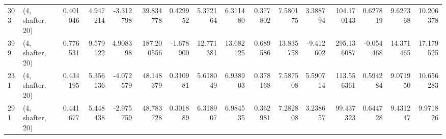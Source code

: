 \begin{tabular}{llrrrrrrrrrrrrrr}
303 &  (4, shafter, 20) &   0.401046 &   4.947214 &  -3.312798 &    39.834778 &   0.429952 &   5.372164 &   6.311480 &  0.377802 &   7.580175 &   3.388794 &   104.170143 &  0.627819 &   9.627368 &  10.206378 \\
399 &  (4, shafter, 20) &   0.776531 &   9.579122 &   4.908398 &   187.200556 &  -1.678900 &  12.771381 &  13.682125 &  0.689586 &  13.835758 &  -9.412602 &   295.136087 & -0.054468 &  14.371465 &  17.179525 \\
231 &  (4, shafter, 20) &   0.434195 &   5.356136 &  -4.072579 &    48.148379 &   0.310981 &   5.618049 &   6.938903 &  0.378168 &   7.587508 &   5.590714 &   113.556361 &  0.594284 &   9.071950 &  10.656283 \\
291 &  (4, shafter, 20) &   0.441677 &   5.448438 &  -2.975759 &    48.783728 &   0.301889 &   6.318907 &   6.984535 &  0.362981 &   7.282808 &   3.238657 &    99.437323 &  0.644728 &   9.431247 &   9.971826 \\
\bottomrule
\end{tabular}
